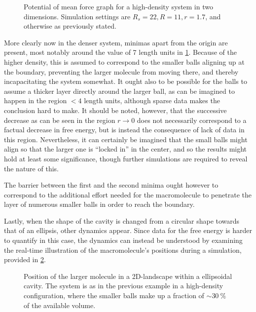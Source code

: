 \documentclass[a4paper,12pt]{article}
\theoremstyle{plain}
\theoremstyle{definition}
\begin{document}
   \begin{figure}[H]
      \centering
      \resizebox{.6\columnwidth}{!}{}
      \caption{Potential of mean force graph for a high-density system in two
         dimensions.
      Simulation settings are $R_s = 22, R = 11, r = 1.7$, and otherwise as
      previously stated.}
      \label{fig:exc2}            
   \end{figure}

   More clearly now in the denser system, minimas apart from the origin are
   present, most notably around the value of 7 length units in \cref{fig:exc2}.
   Because of the higher density, this is assumed to correspond to the smaller
   balls aligning up at the boundary, preventing the larger molecule from moving
   there, and thereby incapacitating the system somewhat. It ought also to be
   possible for the balls to assume a thicker layer directly around the larger
   ball, as can be imagined to
   happen in the region $<4$ length units, although sparse data makes the
   conclusion hard to make. It should be noted, however, that the successive
   decrease as can be seen in the region $r \rightarrow 0$ does not
   necessarily correspond to a factual decrease in free energy, but is instead
   the consequence of lack of data in this region. Nevertheless, it can
   certainly be imagined that the small balls might align so that the larger one
   is ``locked in'' in the center, and so the results might hold at least some
   significance, though further simulations are required to reveal the nature of
   this.

   The barrier between the first and the second minima ought however to
   correspond to the additional effort needed for the macromolecule to penetrate the
   layer of numerous smaller balls in order to reach the boundary.  

   Lastly, when the shape of the cavity is changed from a circular shape towards
   that of an ellipsis, other dynamics appear. Since data for the free energy is
   harder to quantify in this case, the dynamics can instead be understood by
   examining the real-time illustration of the macromolecule's positions during
   a simulation, provided in \cref{fig:exc3}.
   
   \begin{figure}[H]
      \centering
      \resizebox{.6\columnwidth}{!}{}
      \caption{Position of the larger molecule in a 2D-landscape within a 
      ellipsoidal cavity. The system is as in the previous example in a high-density 
      configuration, where the smaller balls make up a fraction of $\sim 30~\%$ of the
      available volume.}
      \label{fig:exc3}            
   \end{figure}
\end{document}
